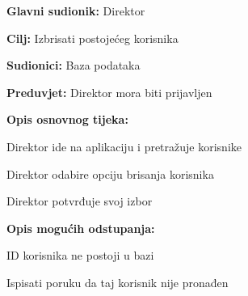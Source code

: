 								
			\noindent {}
			\begin{packed_item}
				
				\item \textbf{Glavni sudionik: } Direktor
				\item  \textbf{Cilj:} Izbrisati postojećeg korisnika
				\item  \textbf{Sudionici:} Baza podataka
				\item  \textbf{Preduvjet:} Direktor mora biti prijavljen
				\item  \textbf{Opis osnovnog tijeka:}
				
				\item[] \begin{packed_enum}
					
					\item Direktor ide na aplikaciju i pretražuje korisnike
					\item Direktor odabire opciju brisanja korisnika
					\item Direktor potvrđuje svoj izbor
				\end{packed_enum}
				
				\item  \textbf{Opis mogućih odstupanja:}
				
				\item[] \begin{packed_item}
					
					\item[2.a] ID korisnika ne postoji u bazi
					\item[] \begin{packed_enum}
						
						\item Ispisati poruku da taj korisnik nije pronađen
						
					\end{packed_enum}
					
				\end{packed_item}
			\end{packed_item}
			
